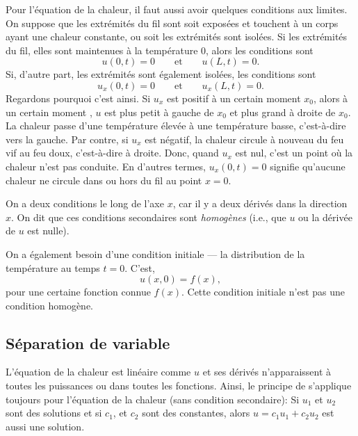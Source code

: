 Pour l'équation de la chaleur, il faut aussi avoir quelques
conditions aux limites.
On suppose que les extrémités du fil sont soit exposées
et touchent à un corps ayant une chaleur constante,  ou  soit les extrémités sont isolées.
Si les extrémités du fil, elles sont maintenues à la température 0, alors
les conditions sont
\begin{equation*}
u(0,t) = 0 \qquad \text{et} \qquad u(L,t) = 0.
\end{equation*}
Si,  d'autre part,  les extrémités sont également isolées,  les conditions sont
\begin{equation*}
u_x(0,t) = 0 \qquad \text{et} \qquad
u_x(L,t) = 0 .
\end{equation*}
Regardons pourquoi c'est ainsi.
Si $ u_x $ est positif à un certain moment $ x_0 $,  alors à un certain moment ,
$ u $ est plus petit à gauche de $ x_0 $ et plus grand à droite de $ x_0 $.
La chaleur passe d'une température élevée à une température basse, c'est-à-dire vers la gauche.
Par contre,  si $ u_x $ est négatif, la chaleur circule à nouveau
du feu vif au feu doux, c'est-à-dire à droite.  Donc,  quand $ u_x $ est nul,  c'est un point où la chaleur n'est pas conduite.  En d'autres termes, $ u_x (0, t) = 0 $ signifie qu'aucune chaleur ne circule dans ou hors du fil au point $ x = 0 $.

On a deux conditions le long de l'axe $ x $, car il y a
deux dérivés dans la direction $ x $.
On dit que ces conditions secondaires sont
\emph{homogènes }
(i.e.,  que $u$ ou la dérivée de $u$ est nulle).

On a également besoin d'une condition initiale --- la distribution de la température
au temps $ t = 0 $.  C'est,
\begin{equation*}
u(x,0) = f(x) ,
\end{equation*}
pour une certaine fonction connue $ f (x) $.
Cette condition initiale n'est pas une condition homogène.

\subsection{Séparation de variable}

L'équation de la chaleur est linéaire comme $ u $ et ses dérivés n'apparaissent à toutes les puissances ou dans toutes les fonctions.
Ainsi,  le principe de  s'applique toujours pour
l'équation de la chaleur
(sans condition secondaire):
Si $ u_1 $ et $ u_2 $ sont des
solutions et si $ c_1 $, et $ c_2 $ sont des constantes,  alors
$ u = c_1 u_1 + c_2 u_2 $ est aussi une solution.


